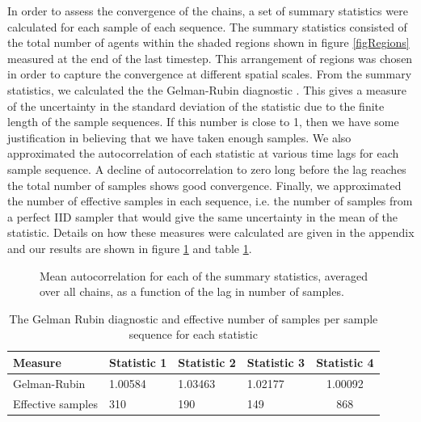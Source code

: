 \documentclass{article}
\begin{document}
In order to assess the convergence of the chains, a set of summary statistics were calculated for each sample of each sequence. The summary statistics consisted of the total number of agents within the shaded regions shown in figure \ref{figRegions} measured at the end of the last timestep. This arrangement of regions was chosen in order to capture the convergence at different spatial scales. From the summary statistics, we calculated the the Gelman-Rubin diagnostic \cite{gelman1992inference}. This gives a measure of the uncertainty in the standard deviation of the statistic due to the finite length of the sample sequences. If this number is close to 1, then we have some justification in believing that we have taken enough samples. We also approximated the autocorrelation of each statistic at various time lags for each sample sequence. A decline of autocorrelation to zero long before the lag reaches the total number of samples shows good convergence. Finally, we approximated the number of effective samples in each sequence, i.e. the number of samples from a perfect IID sampler that would give the same uncertainty in the mean of the statistic. Details on how these measures were calculated are given in the appendix and our results are shown in figure \ref{figAutocorrelation} and table \ref{convergenceResults}.

\begin{figure}
	\centering
	\caption{Mean autocorrelation for each of the summary statistics, averaged over all chains, as a function of the lag in number of samples.}
	\label{figAutocorrelation}
\end{figure}

\begin{table}
	\begin{center}
		\begin{tabular}{llllc}
			\hline
			Measure & Statistic 1 & Statistic 2 & Statistic 3 & Statistic 4\\
			\hline
			Gelman-Rubin &1.00584 & 1.03463 & 1.02177 & 1.00092 \\
			Effective samples & 310 & 190 & 149 & 868 \\
			\hline
		\end{tabular}
	\end{center}
	\caption{The Gelman Rubin diagnostic and effective number of samples per sample sequence for each statistic}
	\label{convergenceResults}
\end{table}
\end{document}
